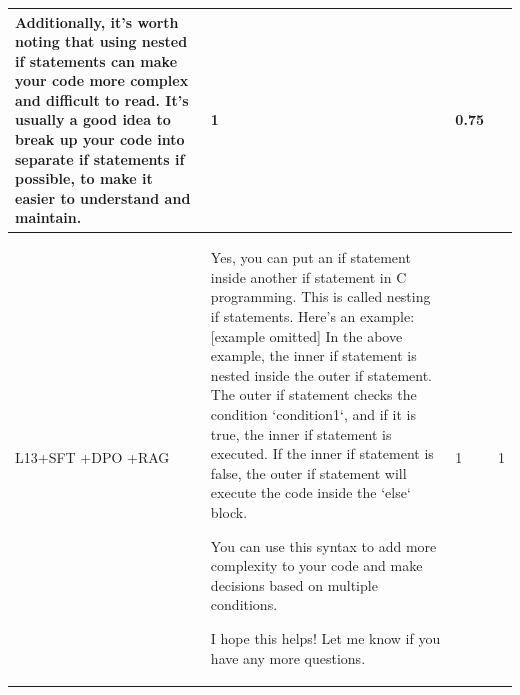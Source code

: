 \begin{table}[!ht]
\begin{tabular}{p{} p{} p{} p{}}
Additionally, it's worth noting that using nested if statements can make your code more complex and difficult to read. It's usually a good idea to break up your code into separate if statements if possible, to make it easier to understand and maintain.
& 1 & 0.75 \\
\midrule
L13+SFT +DPO +RAG & %
Yes, you can put an if statement inside another if statement in C programming. This is called nesting if statements.
Here's an example: [example omitted]
In the above example, the inner if statement is nested inside the outer if statement. The outer if statement checks the condition `condition1`, and if it is true, the inner if statement is executed. If the inner if statement is false, the outer if statement will execute the code inside the `else` block.

You can use this syntax to add more complexity to your code and make decisions based on multiple conditions.

I hope this helps! Let me know if you have any more questions.
& 1 & 1 \\
\bottomrule
\end{tabular}
\end{table}
